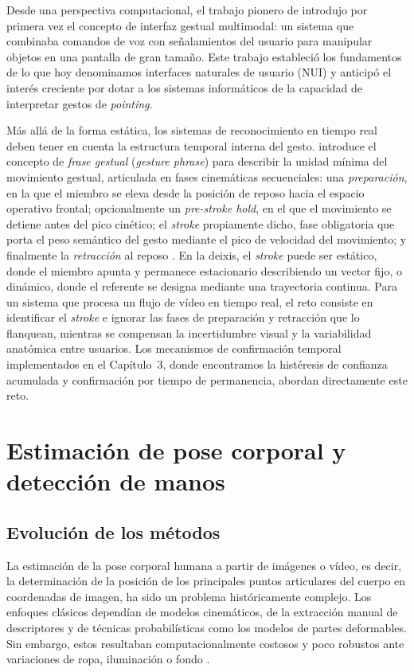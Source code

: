 \documentclass[12pt]{report} %
\begin{document}
Desde una perspectiva computacional, el trabajo pionero de \citet{bolt1980put} introdujo por primera vez el concepto de interfaz gestual multimodal: un sistema que combinaba comandos de voz con señalamientos del usuario para manipular objetos en una pantalla de gran tamaño. Este trabajo estableció los fundamentos de lo que hoy denominamos interfaces naturales de usuario (NUI) y anticipó el interés creciente por dotar a los sistemas informáticos de la capacidad de interpretar gestos de \textit{pointing}.

Más allá de la forma estática, los sistemas de reconocimiento en tiempo real deben tener en cuenta la estructura temporal interna del gesto. \citet{kendon2004} introduce el concepto de \textit{frase gestual} (\textit{gesture phrase}) para describir la unidad mínima del movimiento gestual, articulada en fases cinemáticas secuenciales: una \textit{preparación}, en la que el miembro se eleva desde la posición de reposo hacia el espacio operativo frontal; opcionalmente un \textit{pre-stroke hold}, en el que el movimiento se detiene antes del pico cinético; el \textit{stroke} propiamente dicho, fase obligatoria que porta el peso semántico del gesto mediante el pico de velocidad del movimiento; y finalmente la \textit{retracción} al reposo \citep{mcneill1992}. En la deixis, el \textit{stroke} puede ser estático, donde el miembro apunta y permanece estacionario describiendo un vector fijo, o dinámico, donde el referente se designa mediante una trayectoria continua. Para un sistema que procesa un flujo de vídeo en tiempo real, el reto consiste en identificar el \textit{stroke} e ignorar las fases de preparación y retracción que lo flanquean, mientras se compensan la incertidumbre visual y la variabilidad anatómica entre usuarios. Los mecanismos de confirmación temporal implementados en el Capítulo~3, donde encontramos la histéresis de confianza acumulada y confirmación por tiempo de permanencia, abordan directamente este reto.

\section{Estimación de pose corporal y detección de manos}

\subsection{Evolución de los métodos}

La estimación de la pose corporal humana a partir de imágenes o vídeo, es decir, la determinación de la posición de los principales puntos articulares del cuerpo en coordenadas de imagen, ha sido un problema históricamente complejo. Los enfoques clásicos dependían de modelos cinemáticos, de la extracción manual de descriptores y de técnicas probabilísticas como los modelos de partes deformables. Sin embargo, estos resultaban computacionalmente costosos y poco robustos ante variaciones de ropa, iluminación o fondo \citep{szeliski2022}.
\end{document}
